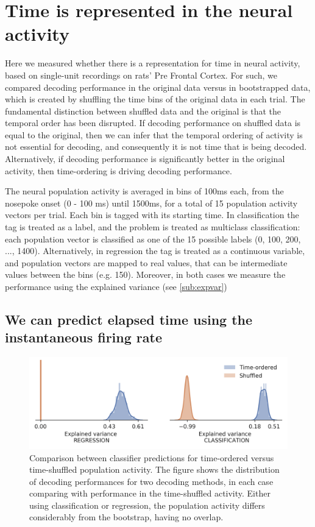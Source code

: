 \chapter{Time is represented in the neural activity}
\label{chap:time_is_represented}

Here we measured whether there is a representation for time in neural activity, based on single-unit recordings on rats' Pre Frontal Cortex. For such, we compared decoding performance in the original data versus in bootstrapped data, which is created by shuffling the time bins of the original data in each trial. The fundamental distinction between shuffled data and the original is that the temporal order has been disrupted. If decoding performance on shuffled data is equal to the original, then we can infer that the temporal ordering of activity is not essential for decoding, and consequently it is not time that is being decoded. Alternatively, if decoding performance is significantly better in the original activity, then time-ordering is driving decoding performance. 

The neural population activity is averaged in bins of 100ms each, from the nosepoke onset (0 - 100 ms) until 1500ms, for a total of 15 population activity vectors per trial. Each bin is tagged with its starting time. In classification the tag is treated as a label, and the problem is treated as multiclass classification: each population vector is classified as one of the 15 possible labels (0, 100, 200, ..., 1400). Alternatively, in regression the tag is treated as a continuous variable, and population vectors are mapped to real values, that can be intermediate values between the bins (e.g. 150). Moreover, in both cases we measure the performance using the explained variance (see \ref{sub:expvar})

\section{We can predict elapsed time using the instantaneous firing rate}
    \begin{figure}
        \centering
        \includegraphics[width=\textwidth]{figures/bootstrap_distribution.png}
        \caption[Comparison between classifier predictions for time-ordered versus time-shuffled population activity]{Comparison between classifier predictions for time-ordered versus time-shuffled population activity. The figure shows the distribution of decoding performances for two decoding methods, in each case comparing with performance in the time-shuffled activity. Either using classification or regression, the population activity differs considerably from the bootstrap, having no overlap.}
        \label{fig:bootstrap_distribution}
    \end{figure}
    
